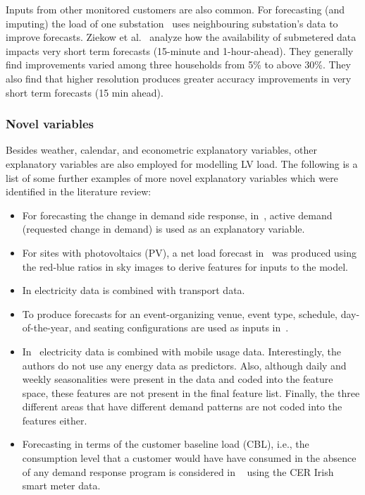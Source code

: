 Inputs from other monitored customers are also common. For forecasting (and imputing) the load of one substation~\cite{borges2020etm} uses neighbouring substation's data to improve forecasts.  Ziekow et al.~\cite{ziekow2013tpo} analyze how the availability of submetered data impacts very short term forecasts (15-minute and 1-hour-ahead). They generally find improvements varied among three households from 5\% to above 30\%. They also find that higher resolution produces greater accuracy improvements in very short term forecasts (15 min ahead).  

\subsubsection{Novel variables}
\label{subsec:novel_var}
Besides weather, calendar, and econometric explanatory variables, other explanatory variables are also employed for modelling LV load. The following is a list of some further examples of more novel explanatory variables which were identified in the literature review:
\begin{itemize}
	\item For forecasting the change in demand side response, in~\cite{garulli2015mat}, active  demand (requested change in demand) is used as an explanatory variable.
	\item For sites with photovoltaics (PV), a net load forecast in~\cite{chu2017nlf} was produced using the red-blue ratios in sky images to derive features for inputs to the model. 
	\item In \cite{Cordova2019cet} electricity data is combined with transport data.
	\item To produce forecasts for an event-organizing venue, event type, schedule, day-of-the-year, and seating configurations are used as inputs in~\cite{grolinger2016eff}.
	\item In~\cite{bogomolov2016ecp} electricity data is combined with mobile usage data. Interestingly, the authors do not use any energy data as predictors. Also, although daily and weekly seasonalities were present in the data and coded into the feature space, these features are not present in the final feature list. Finally, the three different areas that have different demand patterns are not coded into the features either. 
	\item  Forecasting in terms of the customer baseline load (CBL), i.e., the consumption level that a customer would have have consumed in the absence of any demand response program is considered in ~\cite{pati2020mfc} using the CER Irish smart meter data.
\end{itemize}


